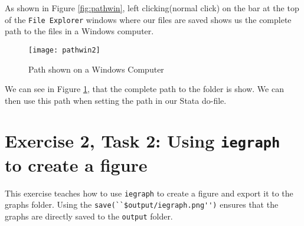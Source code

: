 \documentclass[]{article}
\begin{document}
As shown in Figure \ref{fig:pathwin}, left clicking(normal click) on the bar at the top of the \texttt{File Explorer} windows where our files are saved shows us the complete path to the files in a Windows computer. \\

\begin{figure}[H]
	\centering
	\texttt{[image: pathwin2]}
	\caption{Path shown on a Windows Computer}
	\label{fig:pathwin2}
\end{figure}

We can see in Figure \ref{fig:pathwin2}, that the complete path to the folder is show. We can then use this path when setting the path in our Stata do-file. 

\section*{Exercise 2, Task 2: Using \texttt{iegraph} to create a figure}

This exercise teaches how to use \texttt{iegraph} to create a figure and export it to the graphs folder. Using the \verb|save(``$output/iegraph.png'')| ensures that the graphs are directly saved to the \texttt{output} folder. 

\section*{}
	
\end{document}
